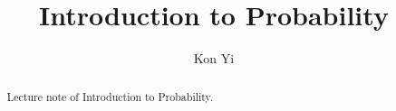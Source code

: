\documentclass[a4paper]{report}
\author{Kon Yi}
\title{Introduction to Probability}
\begin{document}
\maketitle

\begin{abstract}
Lecture note of Introduction to Probability.
\end{abstract}

\newpage

\tableofcontents


\newpage
\appendix
\appendixpage{}



\newpage
\pagestyle{plain}
\printbibliography{}
\end{document}
